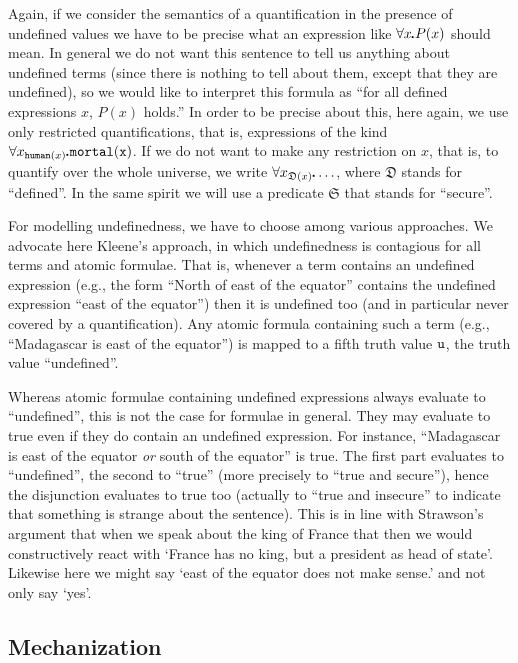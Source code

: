 \documentclass{\filespath jancl}
\def\sdot{\rule{.3ex}{.3ex}\hspace{-0.4ex}\;}
\newcommand{\Defined}{{\mathfrak D}}
\newcommand{\Secure}{{\mathfrak S}}
\newcommand{\undefined}{{\tt u}}
\newcommand{\all}[3]{\forall {#1}_{#2}\sdot #3}
\begin{document}
Again, if we consider the semantics of a quantification in the presence of
undefined values we have to be precise what an expression like
$\forall x\sdot P(x)$ should mean.  In general we do not want this
sentence to tell us anything about undefined terms (since there
is nothing to tell about them, except that they are undefined), so we
would like to interpret this formula as ``for all defined expressions
$x$, $P(x)$ holds.''  In order to be precise about this, here again,
we use only restricted quantifications, that is, expressions of the
kind $\all{x}{{\tt human}(x)} {\tt mortal}(x)$.  If we do not want to
make any restriction on $x$, that is, to quantify over the whole
universe, we write $\all{x}{\Defined(x)} \ldots$, where $\Defined$
stands for ``defined''.  In the same spirit we will use a predicate
$\Secure$ that stands for ``secure''.

For modelling undefinedness, we have to choose among various
approaches.  We advocate here Kleene's approach, in which
undefinedness is contagious for all terms and atomic formulae. That
is, whenever a term contains an undefined expression (e.g., the form
``North of east of the equator'' contains the undefined expression
``east of the equator'') then it is undefined too (and in particular
never covered by a quantification).  Any atomic formula containing
such a term (e.g., ``Madagascar is east of the equator'') is mapped to
a fifth truth value $\undefined$, the truth value ``undefined''.

Whereas atomic formulae containing undefined expressions always
evaluate to ``undefined'', this is not the case for formulae in
general. They may evaluate to true even if they do contain an
undefined expression.  For instance, ``Madagascar is east of the
equator {\em or\/} south of the equator'' is true.  The first part
evaluates to ``undefined'', the second to ``true'' (more precisely to
``true and secure''), hence the disjunction evaluates to true too
(actually to ``true and insecure'' to indicate that something is
strange about the sentence). This is in line with Strawson's argument
that when we speak about the king of France that then we would
constructively react with `France has no king, but a president as head
of state'. Likewise here we might say `east of the equator does not
make sense.' and not only say `yes'.


\subsection{Mechanization}\label{sec:atp}
\end{document}
